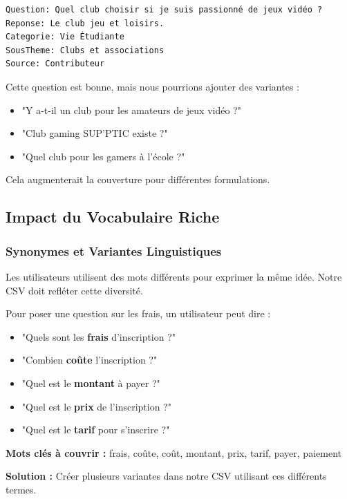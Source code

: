 \documentclass[11pt,a4paper]{article}
\begin{document}
\begin{lstlisting}[caption=Question qui pourrait être enrichie]
Question: Quel club choisir si je suis passionné de jeux vidéo ?
Reponse: Le club jeu et loisirs.
Categorie: Vie Étudiante
SousTheme: Clubs et associations
Source: Contributeur
\end{lstlisting}

\begin{important}
Cette question est bonne, mais nous pourrions ajouter des variantes :

\begin{itemize}
    \item "Y a-t-il un club pour les amateurs de jeux vidéo ?"
    \item "Club gaming SUP'PTIC existe ?"
    \item "Quel club pour les gamers à l'école ?"
\end{itemize}

Cela augmenterait la couverture pour différentes formulations.
\end{important}

\clearpage

\subsection{Impact du Vocabulaire Riche}

\subsubsection{Synonymes et Variantes Linguistiques}

Les utilisateurs utilisent des mots différents pour exprimer la même idée. Notre CSV doit refléter cette diversité.

\begin{exemple}

Pour poser une question sur les frais, un utilisateur peut dire :

\begin{itemize}
    \item "Quels sont les \textbf{frais} d'inscription ?"
    \item "Combien \textbf{coûte} l'inscription ?"
    \item "Quel est le \textbf{montant} à payer ?"
    \item "Quel est le \textbf{prix} de l'inscription ?"
    \item "Quel est le \textbf{tarif} pour s'inscrire ?"
\end{itemize}

\vspace{0.3cm}
\textbf{Mots clés à couvrir :} frais, coûte, coût, montant, prix, tarif, payer, paiement

\vspace{0.3cm}
\textbf{Solution :} Créer plusieurs variantes dans notre CSV utilisant ces différents termes.
\end{exemple}
\end{document}
